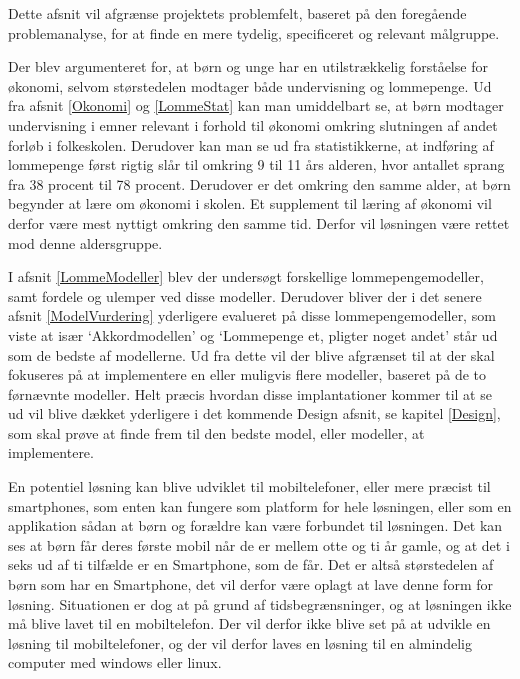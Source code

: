 Dette afsnit vil afgrænse projektets problemfelt, baseret på den foregående problemanalyse, for at finde en mere tydelig, specificeret og relevant målgruppe.

Der blev argumenteret for, at børn og unge har en utilstrækkelig forståelse for økonomi, selvom størstedelen modtager både undervisning og lommepenge. Ud fra afsnit \ref{Okonomi}  og \ref{LommeStat}  kan man umiddelbart se, at børn modtager undervisning i emner relevant i forhold til økonomi omkring slutningen af andet forløb i folkeskolen. Derudover kan man se ud fra statistikkerne, at indføring af lommepenge først rigtig slår til omkring 9 til 11 års alderen, hvor antallet sprang fra 38 procent til 78 procent. Derudover er det omkring den samme alder, at børn begynder at lære om økonomi i skolen. Et supplement til læring af økonomi vil derfor være mest nyttigt omkring den samme tid. Derfor vil løsningen være rettet mod denne aldersgruppe.

I afsnit \ref{LommeModeller} blev der undersøgt forskellige lommepengemodeller, samt fordele og ulemper ved disse modeller. Derudover bliver der i det senere afsnit \ref{ModelVurdering} yderligere evalueret på disse lommepengemodeller, som viste at især ‘Akkordmodellen’ og ‘Lommepenge et, pligter noget andet’ står ud som de bedste af modellerne. Ud fra dette vil der blive afgrænset til at der skal fokuseres på at implementere en eller muligvis flere modeller, baseret på de to førnævnte modeller. Helt præcis hvordan disse implantationer kommer til at se ud vil blive dækket yderligere i det kommende Design afsnit, se kapitel \ref{Design}, som skal prøve at finde frem til den bedste model, eller modeller, at implementere.

En potentiel løsning kan blive udviklet til mobiltelefoner, eller mere præcist til smartphones, som enten kan fungere som platform for hele løsningen, eller som en applikation sådan at børn og forældre kan være forbundet til løsningen. Det kan ses at børn får deres første mobil når de er mellem otte og ti år gamle, og at det i seks ud af ti tilfælde er en Smartphone, som de får\cite{BornSmart}. Det er altså størstedelen af børn som har en Smartphone, det vil derfor være oplagt at lave denne form for løsning. Situationen er dog at på grund af tidsbegrænsninger, og at løsningen ikke må blive lavet til en mobiltelefon. Der vil derfor ikke blive set på at udvikle en løsning til mobiltelefoner, og der vil derfor laves en løsning til en almindelig computer med windows eller linux.

